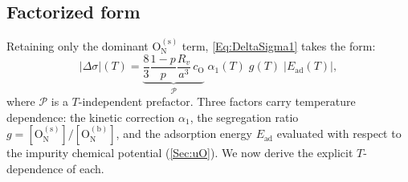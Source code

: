 \documentclass[preprint,12pt,sort&compress]{elsarticle}
\newcommand{\?}{\stackrel{?}{=}}
\providecommand{\DIFaddtex}[1]{{\bf #1}} %
\providecommand{\DIFdeltex}[1]{} %
\providecommand{\DIFaddbegin}{\protect\color{blue}} %
\providecommand{\DIFaddend}{\protect\color{black}} %
\providecommand{\DIFdelbegin}{\protect\color{red}} %
\providecommand{\DIFdelend}{\protect\color{black}} %
\providecommand{\DIFadd}[1]{\texorpdfstring{\DIFaddtex{#1}}{#1}} %
\providecommand{\DIFdel}[1]{\texorpdfstring{\DIFdeltex{#1}}{}} %
\begin{document}
\subsection{Factorized form}
\label{App:Tpeak:Factorization}

Retaining only the dominant $\text{O}_\text{N}^{(\text{s})}$ term, \cref{Eq:DeltaSigma1} takes the form:
\begin{equation}
|\Delta \sigma|(T) = \underbrace{\frac{8}{3}\frac{1-p}{p}\frac{R_v}{a^3}\,c_\text{O}}_{\displaystyle\mathcal{P}}\;\alpha_1(T)\;g(T)\;|E_\text{ad}(T)|,
\label{Eq:App:Factorization}
\end{equation}
where $\mathcal{P}$ is a $T$-independent prefactor. Three factors carry temperature dependence: the kinetic correction $\alpha_1$, the segregation ratio \DIFdelbegin \DIFdel{$g \equiv [\text{O}_\text{N}^{(\text{s})}]/[\text{O}_\text{N}^{(\text{b})}]$}\DIFdelend \DIFaddbegin \DIFadd{$g = [\text{O}_\text{N}^{(\text{s})}]/[\text{O}_\text{N}^{(\text{b})}]$}\DIFaddend , and the adsorption energy $E_\text{ad}$ evaluated with respect to the impurity chemical potential (\cref{Sec:uO}). We now derive the explicit $T$-dependence of each.
\end{document}

